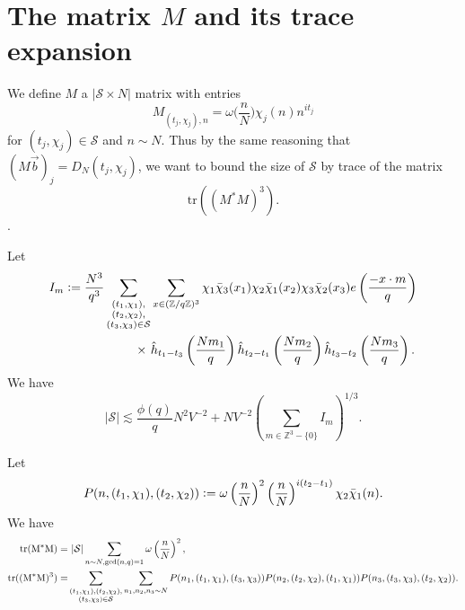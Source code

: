 \section{The matrix $M$ and its trace expansion}
We define $M$ a $|\mathcal{S}\times N|$ matrix with entries
\[
    M_{(t_j,\chi_j),n} = \omega\Big(\frac{n}{N}\Big)\chi_j(n)n^{it_j}
\]
for $(t_j,\chi_j)\in\mathcal{S}$ and $n\sim N$.
Thus by the same reasoning that $(M\vec{b})_j=D_N(t_j,\chi_j)$,
we want to bound the size of $\mathcal{S}$ by trace of the matrix \[
\textrm{tr}((M^*M)^3).
\].

\begin{proposition} \label{setup_poisson}
    Let  \begin{align*}
        I_m\defeq\frac{N^3}{q^3}\sum_{\substack{(t_1,\chi_1),\\(t_2,\chi_2),\\(t_3,\chi_3)\in\mathcal{S}}} &\sum_{x\in (\mathbb{Z}/q\mathbb{Z})^3}\chi_1\bar{\chi}_3(x_1)\chi_2\bar{\chi}_1(x_2)\chi_3\bar{\chi}_2(x_3) e\left(\frac{-x\cdot m}{q}\right)\\
        \times \ &\hat{h}_{t_1-t_3}\left(\frac{Nm_1}{q}\right)\hat{h}_{t_2-t_1}\left(\frac{Nm_2}{q}\right)\hat{h}_{t_3-t_2}\left(\frac{Nm_3}{q}\right).
    \end{align*}
    We have \[
    |\mathcal{S}|\lesssim \frac{\phi(q)}{q}N^2V^{-2}+ NV^{-2}\left(\sum_{m\in\mathbb{Z}^3 - \{0\}} I_m\right)^{1/3}.
    \]
\end{proposition}
\begin{lemma}
    Let \[
    P(n,(t_1,\chi_1),(t_2,\chi_2))\mathrel{\mathop:}= \omega\left(\frac{n}{N}\right)^2 \left(\frac{n}{N}\right)^{i(t_2-t_1)}\chi_2\bar{\chi}_1(n).
    \]
    We have 
    \begin{align*}
        \rm{tr}(M^*M) = & \ |\mathcal{S}|\sum_{n\sim N, \gcd (n,q)=1} \omega\left(\frac{n}{N}\right)^2, \\
        \rm{tr}((M^*M)^3)=&\sum_{\substack{(t_1,\chi_1),(t_2,\chi_2),\\(t_3,\chi_3)\in\mathcal{S}}}\sum_{n_1,n_2,n_3\sim N} 
        P(n_1,(t_1,\chi_1),(t_3,\chi_3))P(n_2,(t_2,\chi_2),(t_1,\chi_1))P(n_3,(t_3,\chi_3),(t_2,\chi_2)).
    \end{align*}
\end{lemma}
